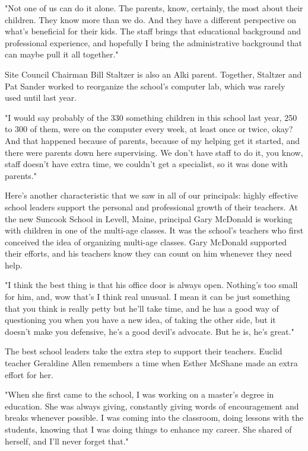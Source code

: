 "Not one of us can do it alone. The parents, know, certainly, the most about their children. They know more than we do. And they have a different perspective on what's beneficial for their kids. The staff brings that educational background and professional experience, and hopefully I bring the administrative background that can maybe pull it all together."

Site Council Chairman Bill Staltzer is also an Alki parent. Together, Staltzer and Pat Sander worked to reorganize the school's computer lab, which was rarely used until last year.

"I would say probably of the 330 something children in this school last year, 250 to 300 of them, were on the computer every week, at least once or twice, okay? And that happened because of parents, because of my helping get it started, and there were parents down here supervising. We don't have staff to do it, you know, staff doesn't have extra time, we couldn't get a specialist, so it was done with parents."

Here's another characteristic that we saw in all of our principals: highly effective school leaders support the personal and professional growth of their teachers. At the new Suncook School in Levell, Maine, principal Gary McDonald is working with children in one of the multi-age classes. It was the school's teachers who first conceived the idea of organizing multi-age classes. Gary McDonald supported their efforts, and his teachers know they can count on him whenever they need help.

"I think the best thing is that his office door is always open. Nothing's too small for him, and, wow that's I think real unusual. I mean it can be just something that you think is really petty but he'll take time, and he has a good way of questioning you when you have a new idea, of taking the other side, but it doesn't make you defensive, he's a good devil's advocate. But he is, he's great."

The best school leaders take the extra step to support their teachers. Euclid teacher Geraldine Allen remembers a time when Esther McShane made an extra effort for her.

"When she first came to the school, I was working on a master's degree in education. She was always giving, constantly giving words of encouragement and breaks whenever possible. I was coming into the classroom, doing lessons with the students, knowing that I was doing things to enhance my career. She shared of herself, and I'll never forget that."

